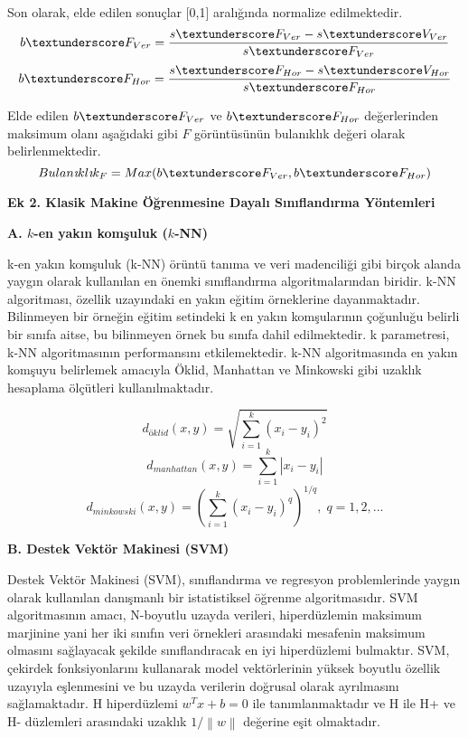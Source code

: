 	
	Son olarak, elde edilen sonuçlar [0,1] aralığında normalize edilmektedir.	
	\begin{equation}
	    b\textunderscore F_{Ver}=\frac{s\textunderscore F_{Ver}-s\textunderscore V_{Ver}}{s\textunderscore F_{Ver}}
	\end{equation}
	\begin{equation}
	    b\textunderscore F_{Hor}=\frac{s\textunderscore F_{Hor}-s\textunderscore V_{Hor}}{s\textunderscore F_{Hor}}
	\end{equation}
	
	Elde edilen $b\textunderscore F_{Ver}$ ve  $b\textunderscore F_{Hor}$ değerlerinden maksimum olanı aşağıdaki gibi $F$ görüntüsünün bulanıklık değeri olarak belirlenmektedir.
	\begin{equation}
	    Bulan\textit{\i}kl\textit{\i}k_{F} = Max(b\textunderscore F_{Ver}, b\textunderscore F_{Hor})
	\end{equation}
	
	\textbf{Ek 2. Klasik Makine Öğrenmesine Dayalı Sınıflandırma Yöntemleri}

	\textbf{A. $k$-en yakın komşuluk ($k$-NN)}

	k-en yakın komşuluk (k-NN) örüntü tanıma ve veri madenciliği gibi birçok alanda yaygın olarak kullanılan en önemki sınıflandırma algoritmalarından biridir. k-NN algoritması, özellik uzayındaki en yakın eğitim örneklerine dayanmaktadır. Bilinmeyen bir örneğin eğitim setindeki k en yakın komşularının çoğunluğu belirli bir sınıfa aitse, bu bilinmeyen örnek bu sınıfa dahil edilmektedir. k parametresi, k-NN algoritmasının performansını etkilemektedir. k-NN algoritmasında en yakın komşuyu belirlemek amacıyla Öklid, Manhattan ve Minkowski gibi uzaklık hesaplama ölçütleri kullanılmaktadır.
	
	\begin{equation}
		d_{\textit{\"o}klid}(x,y)=\sqrt{\sum_{i=1}^{k}(x_{i}-y_{i})^2}
	\end{equation}
	\begin{equation}
		d_{manhattan}(x,y)=\sum_{i=1}^{k}\left | x_{i}-y_{i} \right |
	\end{equation}
	\begin{equation}
	    d_{minkowski}(x,y)=(\sum_{i=1}^{k}(x_{i}-y_{i})^{q})^{1/q},\;q=1,2,...
	\end{equation}
	
	\textbf{B. Destek Vektör Makinesi (SVM)}
	
	Destek Vektör Makinesi (SVM), sınıflandırma ve regresyon problemlerinde yaygın olarak kullanılan danışmanlı bir istatistiksel öğrenme algoritmasıdır. SVM algoritmasının amacı, N-boyutlu uzayda verileri, hiperdüzlemin maksimum marjinine yani her iki sınıfın veri örnekleri arasındaki mesafenin maksimum olmasını sağlayacak şekilde sınıflandıracak en iyi hiperdüzlemi bulmaktır. SVM, çekirdek fonksiyonlarını kullanarak model vektörlerinin yüksek boyutlu özellik uzayıyla eşlenmesini ve bu uzayda verilerin doğrusal olarak ayrılmasını sağlamaktadır. H hiperdüzlemi $w^{T}x+b=0$ ile tanımlanmaktadır ve H ile H+ ve H- düzlemleri arasındaki uzaklık $1/\left \| w \right \|$ değerine eşit olmaktadır.
	
